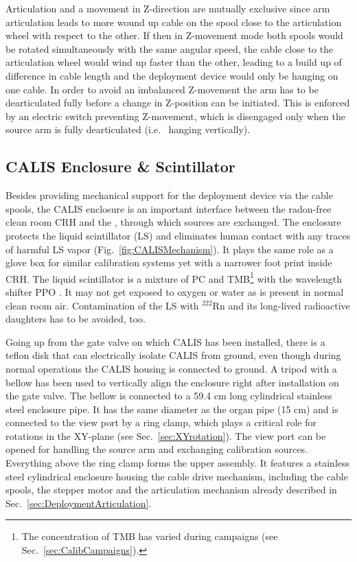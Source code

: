 Articulation and a movement in Z-direction are mutually exclusive since arm articulation leads to more wound up cable on the spool close to the articulation wheel with respect to the other. If then in Z-movement mode both spools would be rotated simultaneously with the same angular speed, the cable close to the articulation wheel would wind up faster than the other, leading to a build up of difference in cable length and the deployment device would only be hanging on one cable. In order to avoid an imbalanced Z-movement the arm has to be dearticulated fully before a change in Z-position can be initiated. This is enforced by an electric switch preventing Z-movement, which is disengaged only when the source arm is fully dearticulated (i.e.~ hanging vertically). 


\subsection{CALIS Enclosure \& Scintillator}

Besides providing mechanical support for the deployment device via the cable spools, the CALIS enclosure is an important interface between the radon-free clean room CRH and the \lsv, through which sources are exchanged. 
The enclosure protects the liquid scintillator (LS) and eliminates human contact with any traces of harmful LS vapor (Fig.~\ref{fig:CALISMechanism}). It plays the same role as a glove box for similar calibration systems yet with a narrower foot print inside CRH. The liquid scintillator is a mixture of PC and TMB\footnote{The concentration of TMB has varied during campaigns (see Sec.~\ref{sec:CalibCampaigns}).} with the wavelength shifter PPO \cite{Agnes:2015qyz}. %
It may not get exposed to oxygen or water as is present in normal clean room air. Contamination of the LS with $^{222}$Rn and its long-lived radioactive daughters has to be avoided, too. 

Going up from the gate valve on which CALIS has been installed, there is a teflon disk that can electrically isolate CALIS from ground, even though during normal operations the CALIS housing is connected to ground. A tripod with a bellow has been used to vertically align the enclosure right after installation on the gate valve. The bellow is connected to a 59.4 cm long cylindrical stainless steel enclosure pipe. It has the same diameter as the organ pipe (15 cm) and is connected to the view port by a ring clamp, which plays a critical role for rotations in the XY-plane (see Sec.~\ref{sec:XYrotation}). The view port can be opened for handling the source arm and exchanging calibration sources. Everything above the ring clamp forms the upper assembly. It features a stainless steel cylindrical enclosure housing the cable drive mechanism, including the cable spools, the stepper motor and the articulation mechanism already described in Sec.~\ref{sec:DeploymentArticulation}. 

